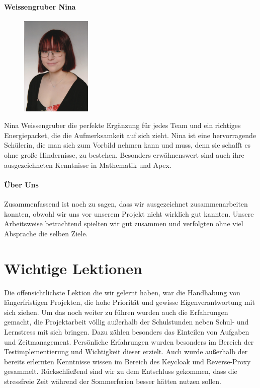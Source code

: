 \subsubsection{Weissengruber Nina}
\begin{figure}
    \begin{center}
      \includegraphics[width=0.3\textwidth]{pics/nina.jpg}
    \end{center}
\end{figure}
Nina Weissengruber die perfekte Ergänzung für jedes Team und ein richtiges Energiepacket, die die 
Aufmerksamkeit auf sich zieht.  
Nina ist eine hervorragende Schülerin, die man sich zum 
Vorbild nehmen kann und muss, denn sie schafft es ohne große Hindernisse, zu bestehen. Besonders erwähnenswert sind auch 
ihre ausgezeichneten Kenntnisse in Mathematik und Apex.

\subsubsection{Über Uns}
Zusammenfassend ist noch zu sagen, dass wir ausgezeichnet zusammenarbeiten konnten, obwohl wir uns vor unserem Projekt  nicht wirklich gut kannten. 
Unsere Arbeitsweise betrachtend spielten wir gut zusammen 
und verfolgten ohne viel Absprache die selben Ziele.

\chapter{Wichtige Lektionen}
Die offensichtlichste Lektion die wir gelernt haben, war die Handhabung von längerfristigen Projekten, die 
hohe Priorität und gewisse Eigenverantwortung mit sich ziehen. Um das noch weiter zu führen wurden auch die 
Erfahrungen gemacht, die Projektarbeit völlig außerhalb der Schulstunden neben Schul- und Lernstress mit sich 
bringen. Dazu zählen besonders das Einteilen von Aufgaben und Zeitmanagement. Persönliche Erfahrungen wurden 
besonders im Bereich der Testimplementierung und Wichtigkeit dieser erzielt. Auch wurde außerhalb der 
bereits erlernten Kenntnisse wissen im Bereich des Keycloak und Reverse-Proxy gesammelt. Rückschließend sind 
wir zu dem Entschluss gekommen, dass die stressfreie Zeit während der Sommerferien besser hätten nutzen sollen.

